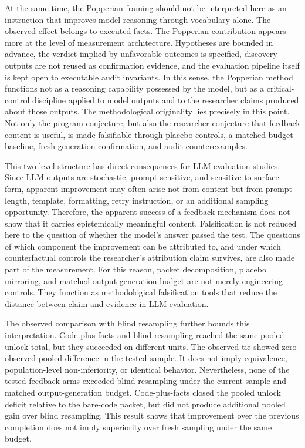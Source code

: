 \documentclass{article}
\numberwithin{equation}{section}  %
\theoremstyle{definition}
\begin{document}
At the same time, the Popperian framing should not be interpreted here as an instruction that improves model reasoning
through vocabulary alone. The observed effect belongs to executed facts. The Popperian
contribution appears more at the level of measurement architecture. Hypotheses are bounded in
advance, the verdict implied by unfavorable outcomes is specified, discovery outputs are not
reused as confirmation evidence, and the evaluation pipeline itself is kept open to
executable audit invariants. In this sense, the Popperian method functions not as a reasoning
capability possessed by the model, but as a critical-control discipline applied to model
outputs and to the researcher claims produced about those outputs. The methodological
originality lies precisely in this point. Not only the program conjecture, but also the
researcher conjecture that feedback content is useful, is made falsifiable through placebo
controls, a matched-budget baseline, fresh-generation confirmation, and audit
counterexamples.

This two-level structure has direct consequences for LLM evaluation studies. Since LLM
outputs are stochastic, prompt-sensitive, and sensitive to surface form, apparent improvement
may often arise not from content but from prompt length, template, formatting, retry
instruction, or an additional sampling opportunity. Therefore, the apparent success of a
feedback mechanism does not show that it carries epistemically meaningful content.
Falsification is not reduced here to the question of whether the model's answer passed the
test. The questions of which component the improvement can be attributed to, and under which
counterfactual controls the researcher's attribution claim survives, are also made part of
the measurement. For this reason, packet decomposition, placebo mirroring, and matched
output-generation budget are not merely engineering controls. They function as methodological
falsification tools that reduce the distance between claim and evidence in LLM evaluation.

The observed comparison with blind resampling further bounds this interpretation.
Code-plus-facts and blind resampling reached the same pooled unlock total, but they succeeded
on different units. The observed tie showed zero observed pooled difference in the tested
sample. It does not imply equivalence, population-level non-inferiority, or identical
behavior. Nevertheless, none of the tested feedback arms exceeded blind resampling under the
current sample and matched output-generation budget. Code-plus-facts closed the pooled unlock
deficit relative to the bare-code packet, but did not produce additional pooled gain over
blind resampling. This result shows that improvement over the previous completion does not
imply superiority over fresh sampling under the same budget.
\end{document}
